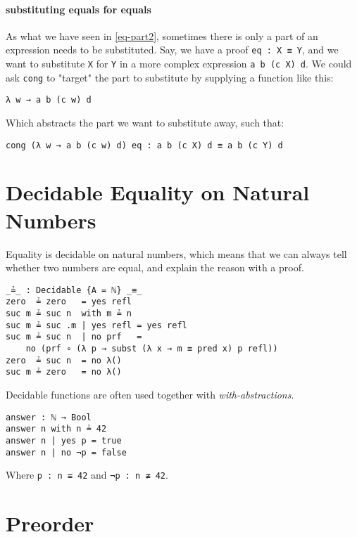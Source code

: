 \documentclass[../thesis.tex]{subfiles}
\begin{document}
\paragraph{substituting equals for equals}

As what we have seen in \ref{eq-part2}, sometimes there is only a part of an
expression needs to be substituted.
Say, we have a proof {\lstinline|eq : X ≡ Y|}, and we want to substitute {\lstinline|X|}
for {\lstinline|Y|} in a more complex expression {\lstinline|a b (c X) d|}.
We could ask {\lstinline|cong|} to "target" the part to substitute by supplying a
function like this:

\begin{lstlisting}
λ w → a b (c w) d
\end{lstlisting}

Which abstracts the part we want to substitute away, such that:

\begin{lstlisting}
cong (λ w → a b (c w) d) eq : a b (c X) d ≡ a b (c Y) d
\end{lstlisting}

\section{Decidable Equality on Natural Numbers}

Equality is decidable on natural numbers, which means that we can always tell
whether two numbers are equal, and explain the reason with a proof.

\begin{lstlisting}
_≟_ : Decidable {A = ℕ} _≡_
zero  ≟ zero   = yes refl
suc m ≟ suc n  with m ≟ n
suc m ≟ suc .m | yes refl = yes refl
suc m ≟ suc n  | no prf   =
    no (prf ∘ (λ p → subst (λ x → m ≡ pred x) p refl))
zero  ≟ suc n  = no λ()
suc m ≟ zero   = no λ()
\end{lstlisting}

Decidable functions are often used together with \textit{with-abstractions}.

\begin{lstlisting}
answer : ℕ → Bool
answer n with n ≟ 42
answer n | yes p = true
answer n | no ¬p = false
\end{lstlisting}

Where {\lstinline|p : n ≡ 42|} and  {\lstinline|¬p : n ≢ 42|}.

\section{Preorder}
\end{document}
